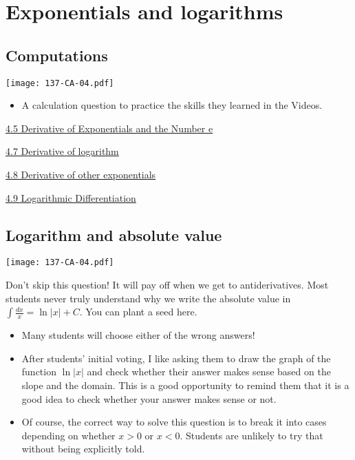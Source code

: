 \documentclass[11pt]{article}
\newcommand {\DS} [1] {${\displaystyle #1}$}
\newcommand{\nl}{\hfill \vspace{-1.1\baselineskip}} %
\newcommand{\vv}{\hspace{8mm} \href{https://www.youtube.com/watch?v=q19VQuujeAI&list=PLlwePzQY_wW-EDeUZebRoA8HGoeZxxpEU&index=5}{4.5 Derivative of Exponentials and the Number e}}
\newcommand{\vvii}{\hspace{8mm} \href{https://www.youtube.com/watch?v=Nx7noVPMkXE&list=PLlwePzQY_wW-EDeUZebRoA8HGoeZxxpEU&index=7}{4.7 Derivative of logarithm}}
\newcommand{\vviii}{\hspace{8mm} \href{https://www.youtube.com/watch?v=GLc0JgegIH4&list=PLlwePzQY_wW-EDeUZebRoA8HGoeZxxpEU&index=8}{4.8 Derivative of other exponentials}}
\newcommand{\vix}{\hspace{8mm} \href{https://www.youtube.com/watch?v=0iF8AUWVrb0&list=PLlwePzQY_wW-EDeUZebRoA8HGoeZxxpEU&index=9}{4.9 Logarithmic Differentiation}}
\begin{document}
\newpage
\section{Exponentials and logarithms}

\subsection{Computations} 

\begin{center}
{ \texttt{[image: 137-CA-04.pdf]}} 
\end{center}


\begin{comments}
\nl
\begin{itemize}
	\item A calculation question to practice the skills they learned in the Videos.
\end{itemize}	
\end{comments}

\begin{videos}
\vv

\vvii

\vviii

\vix
\end{videos}

\newpage

\subsection{Logarithm and absolute value} 

\begin{center}
{ \texttt{[image: 137-CA-04.pdf]}} 
\end{center}


\begin{warning}
Don't skip this question!  It will pay off when we get to antiderivatives. Most students never truly understand why we write the absolute value in \DS{\int \frac{dx}{x} = \ln |x| + C}.  You can plant a seed here.
\end{warning}

\begin{comments}
\nl
\begin{itemize}
	\item Many students will choose either of the wrong answers!   
	\item After students' initial voting, I like asking them to draw the graph of the function $\ln|x|$ and check whether their answer makes sense based on the slope and the domain. This is a good opportunity to remind them that it is a good idea to check whether your answer makes sense or not.
	\item Of course, the correct way to solve this question is to break it into cases depending on whether $x>0$ or $x<0$.  Students are unlikely to try that without being explicitly told.
\end{itemize}	
\end{comments}
\end{document}
